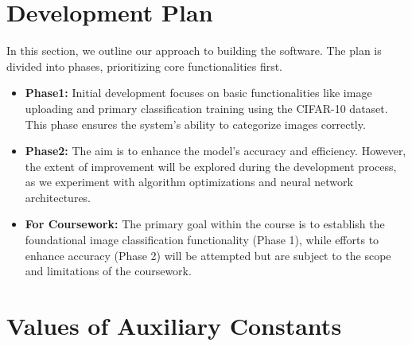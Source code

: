 \documentclass[12pt]{article}
\begin{document}
\section{Development Plan}

In this section, we outline our approach to building the software. 
The plan is divided into phases, prioritizing core functionalities first.

\begin{itemize}
  \item \textbf{Phase1:} Initial development focuses on basic functionalities like image 
  uploading and primary classification training using the CIFAR-10 dataset. 
  This phase ensures the system's ability to categorize images correctly.

  \item \textbf{Phase2:} The aim is to enhance the model's accuracy and efficiency. 
  However, the extent of improvement will be explored during the development process, 
  as we experiment with algorithm optimizations and neural network architectures.

  \item \textbf{For Coursework:} The primary goal within the course is to establish the 
  foundational image classification functionality (Phase 1), while efforts to enhance 
  accuracy (Phase 2) will be attempted but are subject to the scope and limitations 
  of the coursework.
\end{itemize}

\section{Values of Auxiliary Constants}


\end{document}
